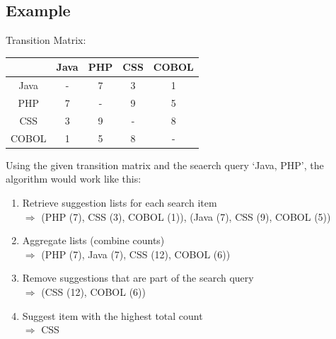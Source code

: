 \subsection{Example}
Transition Matrix:\\
\newline
\begin{tabular}{c | c |c | c | c}
		  & Java & PHP & CSS & COBOL\\
	\hline
	Java  &  -   &  7  &  3  &   1  \\
	\hline
	PHP   &  7   &  -  &  9  &   5  \\
	\hline
	CSS   &  3   &  9  &  -  &   8  \\
	\hline
	COBOL &  1   &  5  &  8  &   -  \\
\end{tabular}
\newline
\newline
Using the given transition matrix and the seaerch query `Java, PHP', the algorithm would work like this:
\begin{enumerate}
	\item Retrieve suggestion lists for each search item\\
		$\Rightarrow$ (PHP (7), CSS (3), COBOL (1)), (Java (7), CSS (9), COBOL (5))
	\item Aggregate lists (combine counts)\\
		$\Rightarrow$ (PHP (7), Java (7), CSS (12), COBOL (6))
	\item Remove suggestions that are part of the search query\\
		$\Rightarrow$ (CSS (12), COBOL (6))
	\item Suggest item with the highest total count\\
		$\Rightarrow$ CSS

\end{enumerate}


